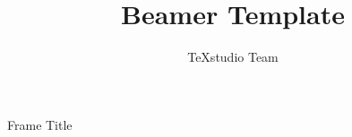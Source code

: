 \documentclass{beamer}
\title{Beamer Template}
\author{TeXstudio Team}
\begin{document}
\begin{frame}[plain]
    \maketitle
\end{frame}
\begin{frame}{Frame Title}
\end{frame}
\end{document}
